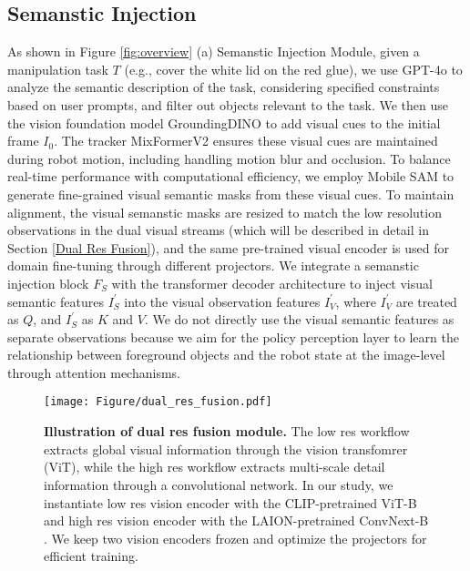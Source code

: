 \subsection{Semanstic Injection}
\label{Semanstic Injection}
As shown in Figure \ref{fig:overview} (a) Semanstic Injection Module, given a manipulation task $T$ (e.g., cover the white lid on the red glue), we use GPT-4o to analyze the semantic description of the task, considering specified constraints based on user prompts, and filter out objects relevant to the task. We then use the vision foundation model GroundingDINO \citep{liu2025grounding} to add visual cues to the initial frame $I_{0}$. The tracker MixFormerV2 \citep{cui2024mixformerv2} ensures these visual cues are maintained during robot motion, including handling motion blur and occlusion. To balance real-time performance with computational efficiency, we employ Mobile SAM \citep{zhang2023faster} to generate fine-grained visual semantic masks from these visual cues. To maintain alignment, the visual semanstic masks are resized to match the low resolution observations in the dual visual streams (which will be described in detail in Section \ref{Dual Res Fusion}), and the same pre-trained visual encoder is used for domain fine-tuning through different projectors. We integrate a semanstic injection block $F_{S}$ with the transformer decoder architecture to inject visual semantic features $I_{S}^{'}$ into the visual observation features $I_{V}^{'}$, where $I_{V}^{'}$ are treated as $Q$, and $I_{S}^{'}$ as $K$ and $V$. We do not directly use the visual semantic features as separate observations because we aim for the policy perception layer to learn the relationship between foreground objects and the robot state at the image-level through attention mechanisms.

\begin{figure}[htbp]
    \centering
    \texttt{[image: Figure/dual\_res\_fusion.pdf]} 
    \caption{\textbf{Illustration of dual res fusion module.} The low res workflow extracts global visual information through the vision transfomrer (ViT), while the high res workflow extracts multi-scale detail information through a convolutional network. In our study, we instantiate low res vision encoder with the CLIP-pretrained ViT-B \citep{radford2021learning} and high res vision encoder with the LAION-pretrained ConvNext-B \citep{liu2022convnet}. We keep two vision encoders frozen and optimize the projectors for efficient training.}
    \label{fig:dual_res_fusion}
\end{figure}

